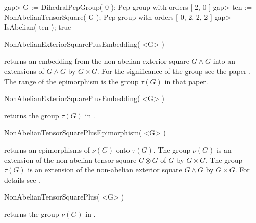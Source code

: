 gap> G := DihedralPcpGroup( 0 );
Pcp-group with orders [ 2, 0 ]
gap> ten := NonAbelianTensorSquare( G );
Pcp-group with orders [ 0, 2, 2, 2 ]
gap> IsAbelian( ten );
true
\endexample

\>NonAbelianExteriorSquarePlusEmbedding( <G> )

returns an embedding from  the non-abelian exterior square $G\wedge G$
into  an  extensions   of  $G\wedge  G$  by  $G\times   G$.   For  the
significance  of the  group  see the  paper \cite{EickNickel07}.   The
range of the epimorphism is the group $\tau(G)$ in that paper.

\>NonAbelianExteriorSquarePlusEmbedding( <G> )

returns the group $\tau(G)$ in \cite{EickNickel07}.

\>NonAbelianTensorSquarePlusEpimorphism( <G> )

returns  an  epimorphisms  of  $\nu(G)$  onto  $\tau(G)$.   The  group
$\nu(G)$ is an extension of the non-abelian tensor square $G\otimes G$
of $G$  by $G\times G$.   The group $\tau(G)$  is an extension  of the
non-abelian exterior  square $G\wedge G$ by $G\times  G$.  For details
see \cite{EickNickel07}.

\>NonAbelianTensorSquarePlus( <G> )

returns the group $\nu(G)$ in \cite{EickNickel07}.



